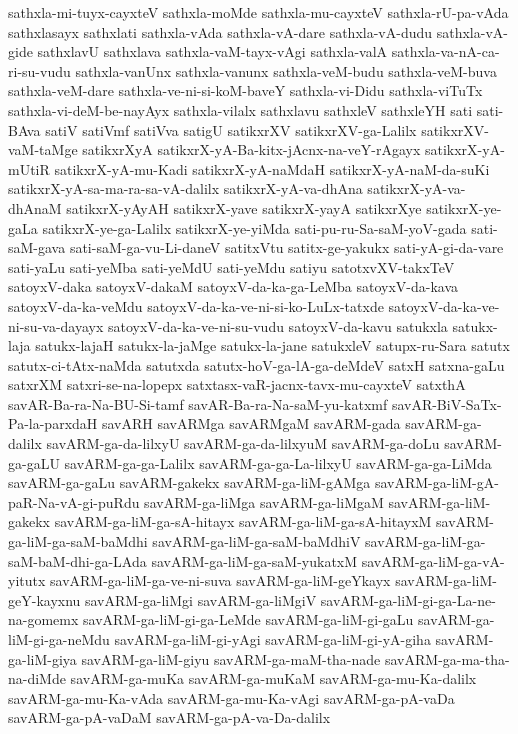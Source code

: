 {sathxla-mi-tuyx-cayxteV
sathxla-moMde
sathxla-mu-cayxteV
sathxla-rU-pa-vAda
sathxlasayx
sathxlati
sathxla-vAda
sathxla-vA-dare
sathxla-vA-dudu
sathxla-vA-gide
sathxlavU
sathxlava
sathxla-vaM-tayx-vAgi
sathxla-valA
sathxla-va-nA-ca-ri-su-vudu
sathxla-vanUnx
sathxla-vanunx
sathxla-veM-budu
sathxla-veM-buva
sathxla-veM-dare
sathxla-ve-ni-si-koM-baveY
sathxla-vi-Didu
sathxla-viTuTx
sathxla-vi-deM-be-nayAyx
sathxla-vilalx
sathxlavu
sathxleV
sathxleYH
sati
sati-BAva
satiV
satiVmf
satiVva
satigU
satikxrXV
satikxrXV-ga-Lalilx
satikxrXV-vaM-taMge
satikxrXyA
satikxrX-yA-Ba-kitx-jAcnx-na-veY-rAgayx
satikxrX-yA-mUtiR
satikxrX-yA-mu-Kadi
satikxrX-yA-naMdaH
satikxrX-yA-naM-da-suKi
satikxrX-yA-sa-ma-ra-sa-vA-dalilx
satikxrX-yA-va-dhAna
satikxrX-yA-va-dhAnaM
satikxrX-yAyAH
satikxrX-yave
satikxrX-yayA
satikxrXye
satikxrX-ye-gaLa
satikxrX-ye-ga-Lalilx
satikxrX-ye-yiMda
sati-pu-ru-Sa-saM-yoV-gada
sati-saM-gava
sati-saM-ga-vu-Li-daneV
satitxVtu
satitx-ge-yakukx
sati-yA-gi-da-vare
sati-yaLu
sati-yeMba
sati-yeMdU
sati-yeMdu
satiyu
satotxvXV-takxTeV
satoyxV-daka
satoyxV-dakaM
satoyxV-da-ka-ga-LeMba
satoyxV-da-kava
satoyxV-da-ka-veMdu
satoyxV-da-ka-ve-ni-si-ko-LuLx-tatxde
satoyxV-da-ka-ve-ni-su-va-dayayx
satoyxV-da-ka-ve-ni-su-vudu
satoyxV-da-kavu
satukxla
satukx-laja
satukx-lajaH
satukx-la-jaMge
satukx-la-jane
satukxleV
satupx-ru-Sara
satutx
satutx-ci-tAtx-naMda
satutxda
satutx-hoV-ga-lA-ga-deMdeV
satxH
satxna-gaLu
satxrXM
satxri-se-na-lopepx
satxtasx-vaR-jacnx-tavx-mu-cayxteV
satxthA
savAR-Ba-ra-Na-BU-Si-tamf
savAR-Ba-ra-Na-saM-yu-katxmf
savAR-BiV-SaTx-Pa-la-parxdaH
savARH
savARMga
savARMgaM
savARM-gada
savARM-ga-dalilx
savARM-ga-da-lilxyU
savARM-ga-da-lilxyuM
savARM-ga-doLu
savARM-ga-gaLU
savARM-ga-ga-Lalilx
savARM-ga-ga-La-lilxyU
savARM-ga-ga-LiMda
savARM-ga-gaLu
savARM-gakekx
savARM-ga-liM-gAMga
savARM-ga-liM-gA-paR-Na-vA-gi-puRdu
savARM-ga-liMga
savARM-ga-liMgaM
savARM-ga-liM-gakekx
savARM-ga-liM-ga-sA-hitayx
savARM-ga-liM-ga-sA-hitayxM
savARM-ga-liM-ga-saM-baMdhi
savARM-ga-liM-ga-saM-baMdhiV
savARM-ga-liM-ga-saM-baM-dhi-ga-LAda
savARM-ga-liM-ga-saM-yukatxM
savARM-ga-liM-ga-vA-yitutx
savARM-ga-liM-ga-ve-ni-suva
savARM-ga-liM-geYkayx
savARM-ga-liM-geY-kayxnu
savARM-ga-liMgi
savARM-ga-liMgiV
savARM-ga-liM-gi-ga-La-ne-na-gomemx
savARM-ga-liM-gi-ga-LeMde
savARM-ga-liM-gi-gaLu
savARM-ga-liM-gi-ga-neMdu
savARM-ga-liM-gi-yAgi
savARM-ga-liM-gi-yA-giha
savARM-ga-liM-giya
savARM-ga-liM-giyu
savARM-ga-maM-tha-nade
savARM-ga-ma-tha-na-diMde
savARM-ga-muKa
savARM-ga-muKaM
savARM-ga-mu-Ka-dalilx
savARM-ga-mu-Ka-vAda
savARM-ga-mu-Ka-vAgi
savARM-ga-pA-vaDa
savARM-ga-pA-vaDaM
savARM-ga-pA-va-Da-dalilx
}
